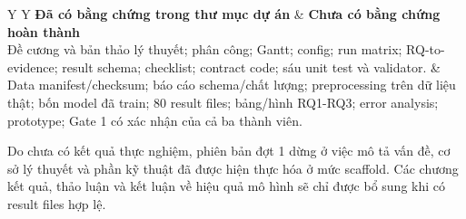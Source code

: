 \documentclass[12pt,a4paper,oneside]{report}
\begin{document}
\begin{table}[H]
\centering
\caption{Phân biệt đầu ra đã có và đầu ra chưa có}
\label{tab:evidence}
\renewcommand{\arraystretch}{1.5}
\begin{tabularx}{\textwidth}{Y Y}
\toprule
\textbf{Đã có bằng chứng trong thư mục dự án} & \textbf{Chưa có bằng chứng hoàn thành} \\
\midrule
Đề cương và bản thảo lý thuyết; phân công; Gantt; config; run matrix; RQ-to-evidence; result schema; checklist; contract code; sáu unit test và validator. & Data manifest/checksum; báo cáo schema/chất lượng; preprocessing trên dữ liệu thật; bốn model đã train; 80 result files; bảng/hình RQ1-RQ3; error analysis; prototype; Gate 1 có xác nhận của cả ba thành viên. \\
\bottomrule
\end{tabularx}
\end{table}

Do chưa có kết quả thực nghiệm, phiên bản đợt 1 dừng ở việc mô tả vấn đề, cơ sở lý thuyết và phần kỹ thuật đã được hiện thực hóa ở mức scaffold. Các chương kết quả, thảo luận và kết luận về hiệu quả mô hình sẽ chỉ được bổ sung khi có result files hợp lệ.
\end{document}
